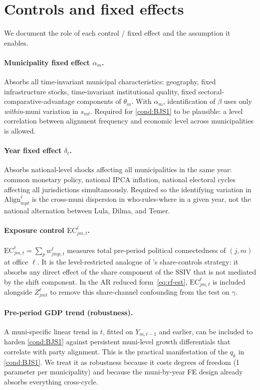 \documentclass{article}
\newcommand{\Align}{\mathrm{Align}}
\newcommand{\EC}{\mathrm{EC}}
\theoremstyle{plain}
\theoremstyle{definition}
\theoremstyle{remark}
\begin{document}
\section{Controls and fixed effects}\label{sec:fe}

We document the role of each control / fixed effect and the assumption it
enables.

\paragraph{Municipality fixed effect $\alpha_m$.}
Absorbs all time-invariant municipal characteristics: geography, fixed
infrastructure stocks, time-invariant institutional quality, fixed
sectoral-comparative-advantage components of $\theta_{m}$. With $\alpha_m$,
identification of $\beta$ uses only \emph{within}-muni variation in
$s_{mt}$. Required for \autoref{cond:BJS1} to be plausible: a level
correlation between alignment frequency and economic level across
municipalities is allowed.

\paragraph{Year fixed effect $\delta_t$.}
Absorbs national-level shocks affecting all municipalities in the same year:
common monetary policy, national IPCA inflation, national electoral
cycles affecting all jurisdictions simultaneously. Required so the
identifying variation in $\Align^{\ell}_{mpt}$ is the cross-muni dispersion in
who-rules-where in a given year, not the national alternation between Lula,
Dilma, and Temer.

\paragraph{Exposure control $\EC^{\ell}_{jm,t}$.}
$\EC^{\ell}_{jm,t}=\sum_p w^{\ell}_{jmp,t}$ measures total pre-period political
connectedness of $(j,m)$ at office $\ell$. It is the level-restricted analogue
of \citeauthor{goldsmith2020bartik}'s share-controls strategy: it absorbs any
direct effect of the share component of the SSIV that is not mediated by the
shift component. In the AR reduced form~\eqref{eq:rf-est}, $\EC^{\ell}_{jm,t}$
is included alongside $Z^{\ell}_{jmt}$ to remove this share-channel
confounding from the test on $\gamma$.

\paragraph{Pre-period GDP trend (robustness).}
A muni-specific linear trend in $t$, fitted on $Y_{m,t-1}$ and earlier, can be
included to harden \autoref{cond:BJS1} against persistent muni-level growth
differentials that correlate with party alignment. This is the practical
manifestation of the $q_k$ in \autoref{cond:BJS1}. We treat it as robustness
because it costs degrees of freedom (1 parameter per municipality) and
because the muni-by-year FE design already absorbs everything cross-cycle.
\end{document}

